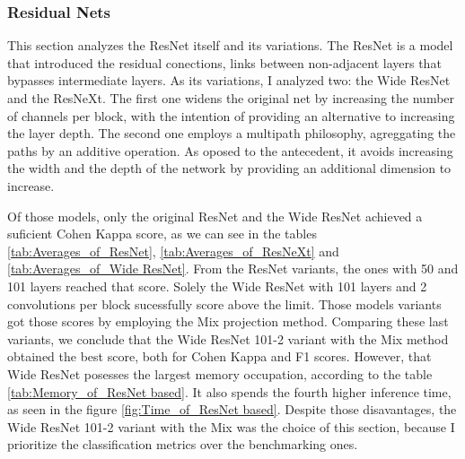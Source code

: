 




\FloatBarrier

\subsubsection{Residual Nets}

This section analyzes the ResNet itself and its variations. The ResNet is a model that introduced the residual conections, links between non-adjacent layers that bypasses intermediate layers. As its variations, I analyzed two: the Wide ResNet and the ResNeXt. The first one widens the original net by increasing the number of channels per block, with the intention of providing an alternative to increasing the layer depth. The second one employs a multipath philosophy, agreggating the paths by an additive operation. As oposed to the antecedent, it avoids increasing the width and the depth of the network by providing an additional dimension to increase. 

Of those models, only the original ResNet and the Wide ResNet achieved a suficient Cohen Kappa score, as we can see in the tables \ref{tab:Averages_of_ResNet}, \ref{tab:Averages_of_ResNeXt} and \ref{tab:Averages_of_Wide ResNet}. From the ResNet variants, the ones with 50 and 101 layers reached that score. Solely the Wide ResNet with 101 layers and 2 convolutions per block sucessfully score above the limit. Those models variants got those scores by employing the \acrshort{Mix} projection method. Comparing these last variants, we conclude that the Wide ResNet 101-2 variant with the \acrshort{Mix} method obtained the best score, both for Cohen Kappa and F1 scores. However, that Wide ResNet posesses the largest memory occupation, according to the table \ref{tab:Memory_of_ResNet based}. It also spends the fourth higher inference time, as seen in the figure \ref{fig:Time_of_ResNet based}. Despite those disavantages, the Wide ResNet 101-2 variant with the \acrshort{Mix} was the choice of this section, because I prioritize the classification metrics over the benchmarking ones.






